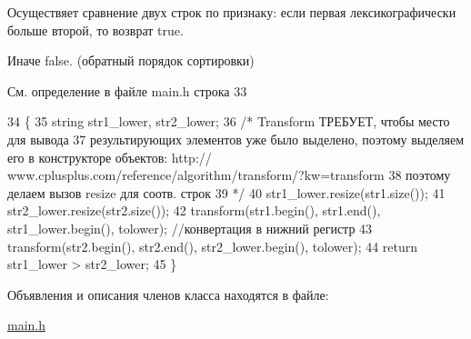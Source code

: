 Осуществяет сравнение двух строк по признаку\+: если первая лексикографически больше второй, то возврат true. 

Иначе false. (обратный порядок сортировки) 

См. определение в файле main.\+h строка 33


\begin{DoxyCode}
34     \{
35         \textcolor{keywordtype}{string} str1\_lower, str2\_lower;
36         \textcolor{comment}{/* Transform ТРЕБУЕТ, чтобы место для вывода}
37 \textcolor{comment}{         результирующих элементов уже было выделено, поэтому выделяем его в конструкторе объектов: http://
      www.cplusplus.com/reference/algorithm/transform/?kw=transform}
38 \textcolor{comment}{         поэтому делаем вызов resize для соотв. строк}
39 \textcolor{comment}{         */}
40         str1\_lower.resize(str1.size());
41         str2\_lower.resize(str2.size());
42         transform(str1.begin(), str1.end(), str1\_lower.begin(), tolower); \textcolor{comment}{//конвертация в нижний регистр}
43         transform(str2.begin(), str2.end(), str2\_lower.begin(), tolower);
44         \textcolor{keywordflow}{return}  str1\_lower > str2\_lower;
45     \}
\end{DoxyCode}


Объявления и описания членов класса находятся в файле\+:\begin{DoxyCompactItemize}
\item 
\hyperlink{main_8h}{main.\+h}\end{DoxyCompactItemize}
